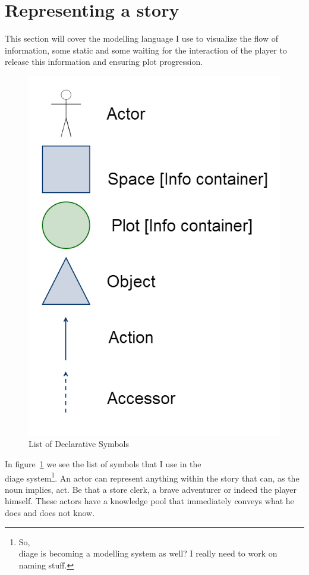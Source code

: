 \documentclass[11pt,a4paper,onecolumn,draft,titlepage]{article}
\newcommand{\diage}{\textsl{Diage }}
\begin{document}
\section{Representing a story}
This section will cover the modelling language I use to visualize the flow of information, some static and some waiting for the interaction of the player to release this information and ensuring plot progression.

\begin{figure}
\includegraphics[scale=0.3]{img/symbols}
\caption{List of Declarative Symbols}
\label{fig:symbols}
\end{figure}
In figure~\ref{fig:symbols} we see the list of symbols that I use in the \\diage system\footnote{So, \\diage is becoming a modelling system as well? I really need to work on naming stuff.}. An actor can represent anything within the story that can, as the noun implies, act. Be that a store clerk, a brave adventurer or indeed the player himself. These actors have a knowledge pool that immediately conveys what he does and does not know.
\end{document}
